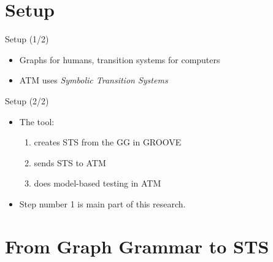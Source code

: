 \documentclass{FMTslides}
\begin{document}
\makecontentsslide

\section[Setup]{Setup}

\begin{frame}{Setup (1/2)}
\begin{itemize}
  \item Graphs for humans, transition systems for computers
  \item ATM uses \textit{Symbolic Transition Systems}
\end{itemize}
\begin{figure}

\end{figure}
\end{frame}

\begin{frame}{Setup (2/2)}
\begin{itemize}
  \item The tool:
  \begin{enumerate}
    \item creates STS from the GG in GROOVE
    \item sends STS to ATM
    \item does model-based testing in ATM
  \end{enumerate}
  \item Step number 1 is main part of this research.
\end{itemize}
\end{frame}

\section[GG2STS]{From Graph Grammar to STS}
\end{document}
